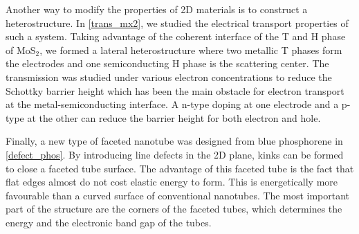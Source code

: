 Another way to modify the properties of 2D materials is to construct a heterostructure. In \autoref{trans_mx2}, we studied the electrical transport properties of such a system. Taking advantage of the coherent interface of the T and H phase of MoS$_2$, we formed a lateral heterostructure where two metallic T phases form the electrodes and one semiconducting H phase is the scattering center. The transmission was studied under various electron concentrations to reduce the Schottky barrier height which has been the main obstacle for electron transport at the metal-semiconducting interface. A n-type doping at one electrode and a p-type at the other can reduce the barrier height for both electron and hole. 

Finally, a new type of faceted nanotube was designed from blue phosphorene in \autoref{defect_phos}. By introducing line defects in the 2D plane, kinks can be formed to close a faceted tube surface. The advantage of this faceted tube is the fact that flat edges almost do not cost elastic energy to form. This is energetically more favourable than a curved surface of conventional nanotubes. The most important part of the structure are the corners of the faceted tubes, which determines the energy and the electronic band gap of the tubes.

